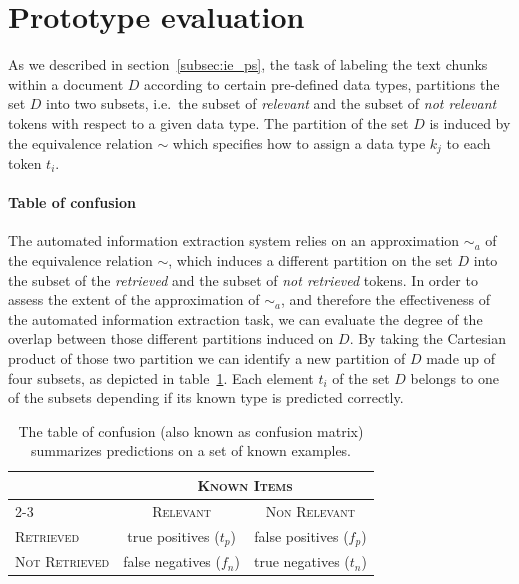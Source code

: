 \section{\label{sec:evaluation}Prototype evaluation}
As we described in section~\ref{subsec:ie_ps}, the task of labeling the text chunks within a document $D$ according to certain pre-defined data types, partitions the set $D$ into two subsets, i.e.\ the subset of \emph{relevant} and the subset of \emph{not relevant} tokens with respect to a given data type. The partition of the set $D$ is induced by the equivalence relation $\sim$ which specifies how to assign a data type $k_j$ to each token $t_i$. 

\paragraph{Table of confusion}The automated information extraction system relies on an approximation $\sim_a$ of the equivalence relation $\sim$, which induces a different partition on the set $D$ into the subset of the \emph{retrieved} and the subset of \emph{not retrieved} tokens. In order to assess the extent of the approximation of $\sim_a$, and therefore the effectiveness of the automated information extraction task, we can evaluate the degree of the overlap between those different partitions induced on $D$. By taking the Cartesian product of those two partition we can identify a new partition of $D$ made up of four subsets, as depicted in table~\ref{tab:relevant_retrieved_partition}. Each element $t_i$ of the set $D$ belongs to one of the subsets depending if its known type is predicted correctly.

\begin{table}
 \centering
 \begin{tabular}{lcc}
 \toprule
   & \multicolumn{2}{c}{\textsc{Known Items}}\\
\cline{2-3}
   & \textsc{Relevant} & \textsc{Non Relevant}\\
 \midrule
 \textsc{Retrieved}     & true positives ($t_p$)  & false positives ($f_p$)\\
 \textsc{Not Retrieved} & false negatives ($f_n$) & true negatives ($t_n$)\\
 \bottomrule
 \end{tabular}
 \caption{The table of confusion (also known as confusion matrix) summarizes predictions on a set of known examples.}
 \label{tab:relevant_retrieved_partition}
\end{table}


